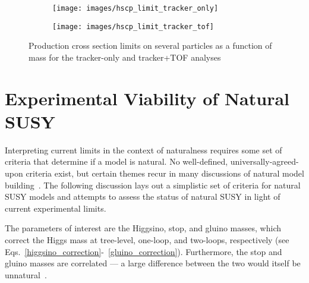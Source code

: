 \documentclass[12pt]{article}
\begin{document}
        \noindent \begin{figure}[htbp] \begin{center}
        \begin{subfigure}[htbp]{0.45\textwidth} \begin{center}
        \texttt{[image: images/hscp\_limit\_tracker\_only]}
        \end{center} \end{subfigure}
        \begin{subfigure}[htbp]{0.45\textwidth} \begin{center}
        \texttt{[image: images/hscp\_limit\_tracker\_tof]}
        \end{center} \end{subfigure}
        \caption{Production cross section limits on several particles as a function of mass for the tracker-only and tracker+TOF analyses~\cite{cms_hscp}}
        \label{hscp_limits}
        \end{center} \end{figure}

\section{Experimental Viability of Natural SUSY}
    Interpreting current limits in the context of naturalness requires some set of criteria that determine if a model is natural. No well-defined, universally-agreed-upon criteria exist, but certain themes recur in many discussions of natural model building~\cite{craig, vestiges, evans_toward_full, feng, cornering, kim}. The following discussion lays out a simplistic set of criteria for natural SUSY models and attempts to assess the status of natural SUSY in light of current experimental limits.
    
    The parameters of interest are the Higgsino, stop, and gluino masses, which correct the Higgs mass at tree-level, one-loop, and two-loops, respectively (see Eqs.~\ref{higgsino_correction}-~\ref{gluino_correction}). Furthermore, the stop and gluino masses are correlated --- a large difference between the two would itself be unnatural~\cite{cornering}.
\end{document}
